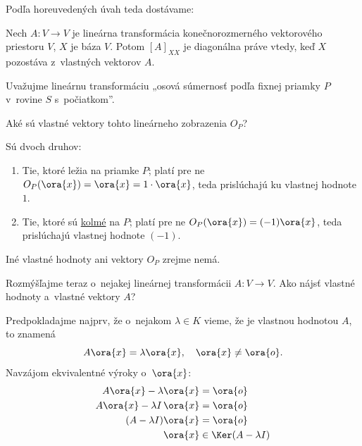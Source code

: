 Podľa horeuvedených úvah teda dostávame:

\begin{tvrdenie}
\label{tvrden:diag-vlastne-vektory}
Nech $A \colon V \to V$ je lineárna transformácia konečnorozmerného vektorového priestoru $V$, $X$ je báza $V$.
Potom $[A]_{XX}$ je diagonálna práve vtedy, keď $X$ pozostáva z~vlastných vektorov $A$.
\end{tvrdenie}

\begin{priklad}
Uvažujme lineárnu transformáciu „osová súmernosť podľa fixnej priamky $P$ v~rovine $S$ s~počiatkom''.

\begin{center}
\end{center}

Aké sú vlastné vektory tohto lineárneho zobrazenia $O_P$?

Sú dvoch druhov:
\begin{enumerate}
  \item Tie, ktoré ležia na priamke $P$; platí pre ne
    $O_P(\ora{x}) = \ora{x} = 1 \cdot \ora{x}$,
    teda prislúchajú ku vlastnej hodnote $1$.

  \item Tie, ktoré sú \underline{kolmé} na $P$; platí pre ne
    $O_P(\ora{x}) = (-1)\ora{x}$,
    teda prislúchajú vlastnej hodnote $(-1)$.
\end{enumerate}

Iné vlastné hodnoty ani vektory $O_P$ zrejme nemá.
\end{priklad}

Rozmýšľajme teraz o~nejakej lineárnej transformácii $A \colon V \to V$.
Ako nájsť vlastné hodnoty a~vlastné vektory $A$?

Predpokladajme najprv, že o~nejakom $\lambda \in K$ vieme, že je vlastnou hodnotou $A$, to znamená
\[
  A\ora{x} = \lambda\ora{x}, \quad \ora{x} \neq \ora{o}.
\]
Navzájom ekvivalentné výroky o~$\ora{x}$:
\begin{align*}
  A\ora{x} - \lambda\ora{x} &= \ora{o} \\
  A\ora{x} - \lambda I\,\ora{x} &= \ora{o} \\
  (A - \lambda I)\ora{x} &= \ora{o} \\
  \ora{x} &\in \Ker(A - \lambda I)
\end{align*}


